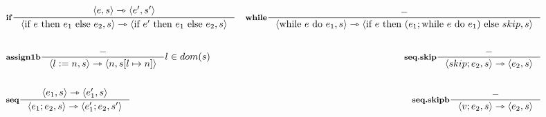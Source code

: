 \documentclass[a4paper, 10pt]{article}
\newcommand{\infer}[4]{\inference[\textbf{#1}]{#2}{#3}#4 }
\newcommand{\srule}[2]{\langle #1 \rangle \rightarrowtriangle \langle #2 \rangle}
\newcommand{\memrep}[3]{#1 \lbrack #2 \mapsto #3 \rbrack}
\begin{document}
\begin{align*}
		&\infer{if}{\srule{e,s}{e',s'}}{\srule{\text{if } e \text{ then } e_1 \text{ else } e_2,s}{\text{if } e' \text{ then } e_1 \text{ else } e_2,s}}{}
		&\infer{while}{-}{\srule{\text{while } e \text{ do } e_1, s}{\text{if } e \text{ then } (e_1; \text{while } e \text{ do } e_1) \text{ else } skip, s}}{} \\ \\
		&\infer{assign1b}{-}{\srule{l:=n,s}{n, \memrep{s}{l}{n}}}{l \in dom(s)}
		&\infer{seq.skip}{-}{\srule{skip;e_2,s}{e_2,s}}{} \\ \\
		&\infer{seq}{\srule{e_1,s}{e_1',s}}{\srule{e_1;e_2,s}{e_1';e_2,s'}}{}
		&\infer{seq.skipb}{-}{\srule{v;e_2,s}{e_2,s}}{}
	\end{align*}
\end{document}

